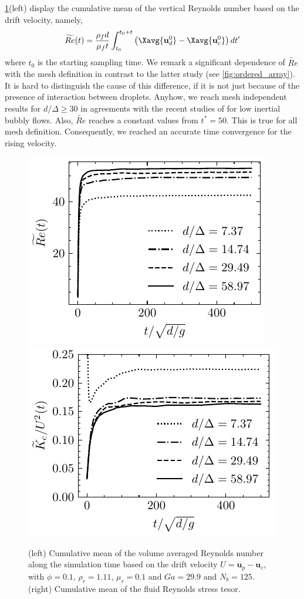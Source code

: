 \ref{fig:Re_and_Tc}(left) display the cumulative mean of the vertical Reynolds number based on the drift velocity, namely,
\begin{equation}
    \widetilde{Re}(t)
    = \frac{\rho_f d}{\mu_f t}\int_{t_0}^{t_0+t} \left(\Xavg{\textbf{u}^0_d} -  \Xavg{\textbf{u}_c^0}\right)dt'
\end{equation}
where $t_0$ is the starting sampling time. 
We remark a significant dependence of $\tilde{Re}$ with the mesh definition in contrast to the latter study (see \ref{fig:ordered_array}). 
It is hard to distinguish the cause of this difference, if it is not just because of the presence of interaction between droplets. 
Anyhow, we reach mesh independent results for $d/\Delta \geq 30$ in agreements with the recent studies of \citet{loisy2017buoyancy} \citet{zhang2021direct} for low inertial bubbly flows.
Also, $\widetilde{Re}$ reaches a constant values from $t^* = 50$. 
This is true for all mesh definition.  
Consequently, we reached an accurate time convergence for the rising velocity. 
\begin{figure}[h!]
    \centering
    \includegraphics[height = 0.3\textwidth]{image/VALIDATION2.0/fCA/Recum.pdf}
    \includegraphics[height = 0.3\textwidth]{image/VALIDATION2.0/fCA/Tcum.pdf}
    \caption{(left) Cumulative mean of the volume averaged Reynolds number along the simulation time based on the drift velocity $U = \textbf{u}_p - \textbf{u}_c$, with $\phi = 0.1$, $\rho_r = 1.11$, $ \mu_r =0.1$ and $Ga = 29.9$ and $N_b = 125$.
    (right) Cumulative mean of the fluid Reynolds stress tesor. }
    \label{fig:Re_and_Tc}
\end{figure}

